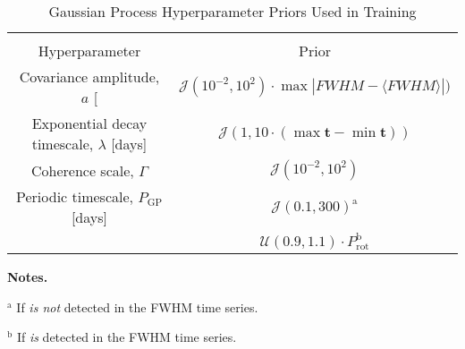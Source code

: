 \begin{table*}
  \small
  \renewcommand{\arraystretch}{0.7}
  \caption{Gaussian Process Hyperparameter Priors Used in Training}
  \label{BStable:gppriors}
  \begin{tabular}{cc}
    \hline \\ [-1ex]
    Hyperparameter & Prior \\
    \hline
    Covariance amplitude, $a$ [\mps{]} & $\mathcal{J}(10^{-2}, 10^2) \cdot \max{|FWHM-\langle FWHM \rangle|})$ \\
    Exponential decay timescale, $\lambda$ [days] & $\mathcal{J}(1, 10\cdot (\max{\mathbf{t}}-\min{\mathbf{t}}))$  \\
    Coherence scale, $\Gamma$ & $\mathcal{J}(10^{-2}, 10^2)$ \\
    Periodic timescale, $P_{\text{GP}}$ [days] & $\mathcal{J}(0.1,300)^{\text{a}}$ \\
    & $\mathcal{U}(0.9, 1.1) \cdot P_{\text{rot}}^{\text{b}}$
  \end{tabular}
  \begin{list}{}{}
  \item {\bf{Notes.}}
  \item $^{\text{a}}$ If \prot{} \emph{is not} detected in the FWHM time series.
  \item $^{\text{b}}$ If \prot{} \emph{is} detected in the FWHM time series.
  \end{list}
\end{table*}
